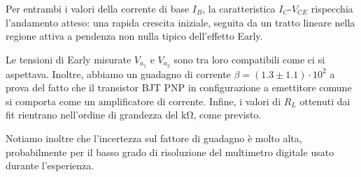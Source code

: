 Per entrambi i valori della corrente di base $I_B$, la caratteristica $I_C$-$V_{CE}$ rispecchia l’andamento atteso: una rapida crescita iniziale, seguita da un tratto lineare nella regione attiva a pendenza non nulla tipico dell’effetto Early.

Le tensioni di Early misurate $V_{a_1}$ e $V_{a_2}$  sono tra loro compatibili come ci si aspettava. Inoltre, abbiamo un guadagno di corrente $\beta = (1.3 \pm 1.1) \cdot 10^{2}$ a prova del fatto che il transistor BJT PNP in configurazione a emettitore comune si comporta come un amplificatore di corrente. Infine, i valori di $R_L$ ottenuti dai fit rientrano nell'ordine di grandezza del \si{\kilo\ohm}, come previsto.

Notiamo inoltre che l’incertezza sul fattore di guadagno è molto alta, probabilmente per il basso grado di risoluzione del multimetro digitale usato durante l’esperienza.